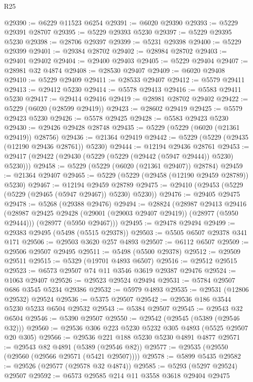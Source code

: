 \begin{lexlean}{R25}
\begin{coremodule}
@29390 := @6229 @11523 @6254
@29391 := @6020 @29390
@29393 := @5229 @29391 @28707
@29395 := @5229 @29393 @5230
@29397 := @5229 @29395 @5230
@29398 := @28706 @29397
@29399 := @5231 @29398
@29400 := @5229 @29399
@29401 := @29384 @28702
@29402 := @28984 @28702
@29403 := @29401 @29402
@29404 := @29400 @29403
@29405 := @5229 @29404
@29407 := @28981 @32 @4874
@29408 := @28530 @29407
@29409 := @6020 @29408
@29410 := @5229 @29409
@29411 := @28533 @29407
@29412 := @5579 @29411
@29413 := @29412 @5230
@29414 := @5578 @29413
@29416 := @5583 @29411 @5230
@29417 := @29414 @29416
@29419 := @28981 @28702 @29402
@29422 := @5229 (@6020 (@28599 @29419))
@29423 := @28602 @29419
@29425 := @5579 @29423 @5230
@29426 := @5578 @29425
@29428 := @5583 @29423 @5230
@29430 := @29426 @29428 @28748
@29435 := @5229 (@5229 (@6020 (@21361 @29419)) @28756)
@29436 := @21364 @29419
@29442 := @5229 (@5229 (@29435 (@12190 @29436 @28761)) @5230)
@29444 := @12194 @29436 @28761
@29453 := @29417 (@29422 (@29430 (@5229 (@5229 (@29442 (@5947 @29444)) @5230) @5230)))
@29458 := @5229 (@5229 (@6020 (@21361 @29407)) @28784)
@29459 := @21364 @29407
@29465 := @5229 (@5229 (@29458 (@12190 @29459 @28789)) @5230)
@29467 := @12194 @29459 @28789
@29475 := @29410 (@29453 (@5229 (@5229 (@29465 (@5947 @29467)) @5230) @5230))
@29476 := @29405 @29475
@29478 := @5268 (@29388 @29476)
@29494 := @28824
    (@28987
      @29413
      @29416
      (@28987 @29425 @29428 (@29001 (@29003 @29407 @29419)) (@28977 (@5950 @29444)))
      (@28977 (@5950 @29467)))
@29495 := @29478 @29494
@29499 := @29383 @29495 (@5498 (@5515 @29378))
@29503 := @5505 @6507 @29378 @341 @171
@29506 := @29503 @3620 @257 @4893
@29507 := @6112 @6507
@29509 := @29506 @29507 @29495
@29511 := @5498 (@5500 @29378)
@29512 := @29509 @29511
@29515 := @5329 (@19701 @4893 @6507)
@29516 := @29512 @29515
@29523 := @6573 @29507 @74 @11 @3546 @3619 @29387 @29476
@29524 := @1063 @29407
@29526 := @29523 @29524 @29494
@29531 := @5784 @29507 @686 @3545 @5234 @29386
@29532 := @5979 @4893
@29535 := @29531 (@12806 @29532) @29524
@29536 := @5375 @29507
@29542 := @29536 @186 @3544 @5230 @5233 @6504 @29532
@29543 := @5384 @29507
@29545 := @29543 @32 @6504
@29546 := @5390 @29507
@29550 := @29542 (@29545 (@5389 (@29546 @32)))
@29560 := @29536 @306 @223 @5230 @5232 @305 @4893 (@5525 @29507 @20 @305)
@29566 := @29536 @221 @188 @5230 @5230 @4891 @4877
@29571 := @29543 @82 @4891 (@5389 (@29546 @82))
@29577 := @29535 (@29550 (@29560 (@29566 @29571 (@5421 @29507))))
@29578 := @5899 @5435
@29582 := @29526 (@29577 (@29578 @32 @4874))
@29585 := @5293 (@5297 @29524) @29507
@29592 := @6573 @29585 @214 @11 @3558 @3618 @29404 @29475

\end{coremodule}
\end{lexlean}
